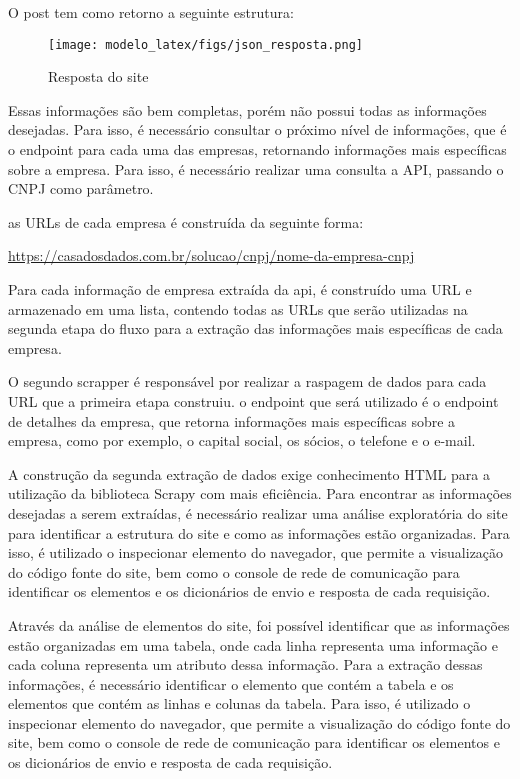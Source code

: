 O post tem como retorno a seguinte estrutura:

\begin{figure}[H]
    \centering
    \texttt{[image: modelo\_latex/figs/json\_resposta.png]}
    \caption{Resposta do site}
    \label{fig:/json_resposta}
\end{figure}

Essas informações são bem completas, porém não possui todas as informações desejadas. Para isso, é necessário consultar o próximo nível de informações, que é o endpoint para cada uma das empresas, retornando informações mais específicas sobre a empresa. Para isso, é necessário realizar uma consulta a API, passando o CNPJ como parâmetro.

as URLs de cada empresa é construída da seguinte forma:



\url{https://casadosdados.com.br/solucao/cnpj/nome-da-empresa-cnpj}


Para cada informação de empresa extraída da api, é construído uma URL e armazenado em uma lista, contendo todas as URLs que serão utilizadas na segunda etapa do fluxo para a extração das informações mais específicas de cada empresa.

O segundo scrapper é responsável por realizar a raspagem de dados para cada URL que a primeira etapa construiu. o endpoint que será utilizado é o endpoint de detalhes da empresa, que retorna informações mais específicas sobre a empresa, como por exemplo, o capital social, os sócios, o telefone e o e-mail.

A construção da segunda extração de dados exige conhecimento HTML para a utilização da biblioteca Scrapy com mais eficiência. Para encontrar as informações desejadas a serem extraídas, é necessário realizar uma análise exploratória do site para identificar a estrutura do site e como as informações estão organizadas. Para isso, é utilizado o inspecionar elemento do navegador, que permite a visualização do código fonte do site, bem como o console de rede de comunicação para identificar os elementos e os dicionários de envio e resposta de cada requisição.

Através da análise de elementos do site, foi possível identificar que as informações estão organizadas em uma tabela, onde cada linha representa uma informação e cada coluna representa um atributo dessa informação. Para a extração dessas informações, é necessário identificar o elemento que contém a tabela e os elementos que contém as linhas e colunas da tabela. Para isso, é utilizado o inspecionar elemento do navegador, que permite a visualização do código fonte do site, bem como o console de rede de comunicação para identificar os elementos e os dicionários de envio e resposta de cada requisição.

